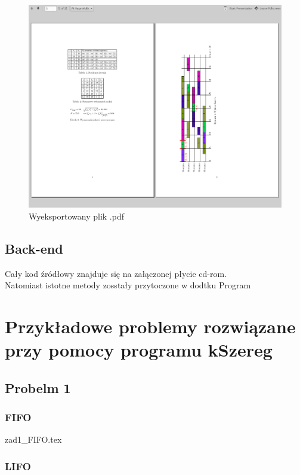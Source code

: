 \documentclass[twoside]{pracaInzynierskaMS}
\begin{document}
\begin{figure}[htb]
    \centering
    \includegraphics[width=\textwidth, keepaspectratio=true]{./pdf}
    \caption{Wyeksportowany plik .pdf}
\end{figure}

\subsection     {Back-end}
  Cały kod źródłowy znajduje się na załączonej płycie cd-rom. \\
Natomiast istotne metody  zosstały przytoczone w dodtku Program \\     
\section        [Przykładowe problemy \ldots]
                 {Przykładowe problemy rozwiązane przy pomocy programu kSzereg}
       
\subsection     {Probelm 1}
\subsubsection  {FIFO}
 {zad1_FIFO.tex}
\subsubsection  {LIFO}

\end{document}
